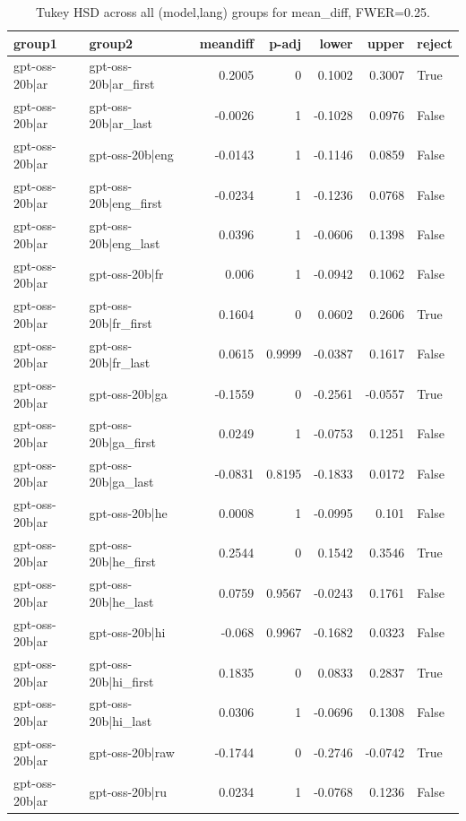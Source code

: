 \begin{table}
\caption{Tukey HSD across all (model,lang) groups for mean_diff, FWER=0.25.}
\label{tab:tukey_all_models_all_langs_mean_diff}
\begin{tabular}{l l r r r r l}
\toprule
group1 & group2 & meandiff & p-adj & lower & upper & reject \\
\midrule
gpt-oss-20b|ar & gpt-oss-20b|ar_first & 0.2005 & 0 & 0.1002 & 0.3007 & True \\
gpt-oss-20b|ar & gpt-oss-20b|ar_last & -0.0026 & 1 & -0.1028 & 0.0976 & False \\
gpt-oss-20b|ar & gpt-oss-20b|eng & -0.0143 & 1 & -0.1146 & 0.0859 & False \\
gpt-oss-20b|ar & gpt-oss-20b|eng_first & -0.0234 & 1 & -0.1236 & 0.0768 & False \\
gpt-oss-20b|ar & gpt-oss-20b|eng_last & 0.0396 & 1 & -0.0606 & 0.1398 & False \\
gpt-oss-20b|ar & gpt-oss-20b|fr & 0.006 & 1 & -0.0942 & 0.1062 & False \\
gpt-oss-20b|ar & gpt-oss-20b|fr_first & 0.1604 & 0 & 0.0602 & 0.2606 & True \\
gpt-oss-20b|ar & gpt-oss-20b|fr_last & 0.0615 & 0.9999 & -0.0387 & 0.1617 & False \\
gpt-oss-20b|ar & gpt-oss-20b|ga & -0.1559 & 0 & -0.2561 & -0.0557 & True \\
gpt-oss-20b|ar & gpt-oss-20b|ga_first & 0.0249 & 1 & -0.0753 & 0.1251 & False \\
gpt-oss-20b|ar & gpt-oss-20b|ga_last & -0.0831 & 0.8195 & -0.1833 & 0.0172 & False \\
gpt-oss-20b|ar & gpt-oss-20b|he & 0.0008 & 1 & -0.0995 & 0.101 & False \\
gpt-oss-20b|ar & gpt-oss-20b|he_first & 0.2544 & 0 & 0.1542 & 0.3546 & True \\
gpt-oss-20b|ar & gpt-oss-20b|he_last & 0.0759 & 0.9567 & -0.0243 & 0.1761 & False \\
gpt-oss-20b|ar & gpt-oss-20b|hi & -0.068 & 0.9967 & -0.1682 & 0.0323 & False \\
gpt-oss-20b|ar & gpt-oss-20b|hi_first & 0.1835 & 0 & 0.0833 & 0.2837 & True \\
gpt-oss-20b|ar & gpt-oss-20b|hi_last & 0.0306 & 1 & -0.0696 & 0.1308 & False \\
gpt-oss-20b|ar & gpt-oss-20b|raw & -0.1744 & 0 & -0.2746 & -0.0742 & True \\
gpt-oss-20b|ar & gpt-oss-20b|ru & 0.0234 & 1 & -0.0768 & 0.1236 & False \\

\end{tabular}
\end{table}
